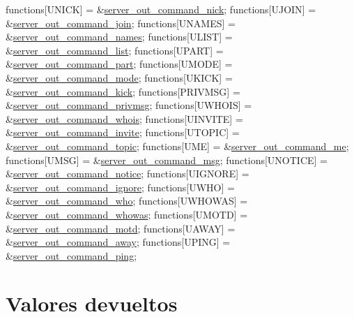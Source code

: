 \begin{DoxyCode}
functions[UNICK]      = &\hyperlink{G-2313-06-P2__client__function__handlers_8h_a43f3e63fcf23bd087e02911f79b789b0}{server\_out\_command\_nick};
functions[UJOIN]      = &\hyperlink{G-2313-06-P2__client__function__handlers_8h_a49e60d29aef3725ab2a91c7f99e61021}{server\_out\_command\_join};
functions[UNAMES]     = &\hyperlink{G-2313-06-P2__client__function__handlers_8h_ab2f3bd779063c27074a6cdce0f98ee0a}{server\_out\_command\_names};
functions[ULIST]      = &\hyperlink{G-2313-06-P2__client__function__handlers_8h_a0a66dad6908cd303ae31f06dda298e5f}{server\_out\_command\_list};
functions[UPART]      = &\hyperlink{G-2313-06-P2__client__function__handlers_8h_a39f81214b8394e2b7fb0989e5fe10fb3}{server\_out\_command\_part};
functions[UMODE]      = &\hyperlink{G-2313-06-P2__client__function__handlers_8h_afa583197101ff2eb07ab93ccd10da962}{server\_out\_command\_mode};
functions[UKICK]      = &\hyperlink{G-2313-06-P2__client__function__handlers_8h_a4e94d9864089e10109fc24ce92d4368b}{server\_out\_command\_kick};
functions[PRIVMSG]    = &\hyperlink{G-2313-06-P2__client__function__handlers_8h_a4c442d20949a3a3e84551a5f23ce8263}{server\_out\_command\_privmsg};
functions[UWHOIS]     = &\hyperlink{G-2313-06-P2__client__function__handlers_8h_af34c02fb3b13802e2c457a302c66cb89}{server\_out\_command\_whois};
functions[UINVITE]    = &\hyperlink{G-2313-06-P2__client__function__handlers_8h_a6760491bb5560bf6db1e652022f0720f}{server\_out\_command\_invite};
functions[UTOPIC]     = &\hyperlink{G-2313-06-P2__client__function__handlers_8h_affd97f456e87778153ec551468bb7f25}{server\_out\_command\_topic};
functions[UME]        = &\hyperlink{G-2313-06-P2__client__function__handlers_8h_a9680c711ecaa492727c14a9c5d7e82ca}{server\_out\_command\_me};
functions[UMSG]       = &\hyperlink{G-2313-06-P2__client__function__handlers_8h_ad2280719361affeaf8d3a663b48f0b3f}{server\_out\_command\_msg};
functions[UNOTICE]    = &\hyperlink{G-2313-06-P2__client__function__handlers_8h_a6e05dad9592e0e473e84647cfe263034}{server\_out\_command\_notice};
functions[UIGNORE]    = &\hyperlink{G-2313-06-P2__client__function__handlers_8h_a3b0bef634e60a6e59223cfb7e444fb36}{server\_out\_command\_ignore};
functions[UWHO]       = &\hyperlink{G-2313-06-P2__client__function__handlers_8h_a4f8f2db21b7edd9e6b7fbad232ee27fd}{server\_out\_command\_who};
functions[UWHOWAS]    = &\hyperlink{G-2313-06-P2__client__function__handlers_8h_a74f475c007446256a2cbada71f51f30a}{server\_out\_command\_whowas};
functions[UMOTD]      = &\hyperlink{G-2313-06-P2__client__function__handlers_8h_ae721ae6a65ec5f0790d6b6883dcf94a5}{server\_out\_command\_motd};
functions[UAWAY]      = &\hyperlink{G-2313-06-P2__client__function__handlers_8h_ac0c8a1e0d4144fd3d78c124bad9228d6}{server\_out\_command\_away};
functions[UPING]      = &\hyperlink{G-2313-06-P2__client__function__handlers_8h_a3719651e6671245a46f4994fcf462c7d}{server\_out\_command\_ping};
\end{DoxyCode}
\hypertarget{client_execute_out_function_return_6}{}\section{Valores devueltos}\label{client_execute_out_function_return_6}

